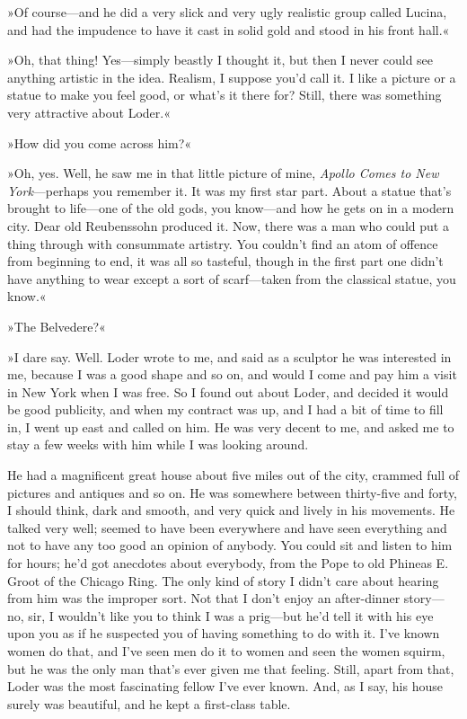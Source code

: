 »Of course—and he did a very slick and very ugly realistic group called Lucina, and had the impudence to have it cast in solid gold and stood in his front hall.«

»Oh, that thing! Yes—simply beastly I thought it, but then I never could see anything artistic in the idea. Realism, I suppose you'd call it. I like a picture or a statue to make you feel good, or what's it there for? Still, there was something very attractive about Loder.«

»How did you come across him?«

»Oh, yes. Well, he saw me in that little picture of mine, \textit{Apollo Comes to New York}—perhaps you remember it. It was my first star part. About a statue that's brought to life—one of the old gods, you know—and how he gets on in a modern city. Dear old Reubenssohn produced it. Now, there was a man who could put a thing through with consummate artistry. You couldn't find an atom of offence from beginning to end, it was all so tasteful, though in the first part one didn't have anything to wear except a sort of scarf—taken from the classical statue, you know.«

»The Belvedere?«

»I dare say. Well. Loder wrote to me, and said as a sculptor he was interested in me, because I was a good shape and so on, and would I come and pay him a visit in New York when I was free. So I found out about Loder, and decided it would be good publicity, and when my contract was up, and I had a bit of time to fill in, I went up east and called on him. He was very decent to me, and asked me to stay a few weeks with him while I was looking around.

He had a magnificent great house about five miles out of the city, crammed full of pictures and antiques and so on. He was somewhere between thirty-five and forty, I should think, dark and smooth, and very quick and lively in his movements. He talked very well; seemed to have been everywhere and have seen everything and not to have any too good an opinion of anybody. You could sit and listen to him for hours; he'd got anecdotes about everybody, from the Pope to old Phineas E. Groot of the Chicago Ring. The only kind of story I didn't care about hearing from him was the improper sort. Not that I don't enjoy an after-dinner story—no, sir, I wouldn't like you to think I was a prig—but he'd tell it with his eye upon you as if he suspected you of having something to do with it. I've known women do that, and I've seen men do it to women and seen the women squirm, but he was the only man that's ever given me that feeling. Still, apart from that, Loder was the most fascinating fellow I've ever known. And, as I say, his house surely was beautiful, and he kept a first-class table.

